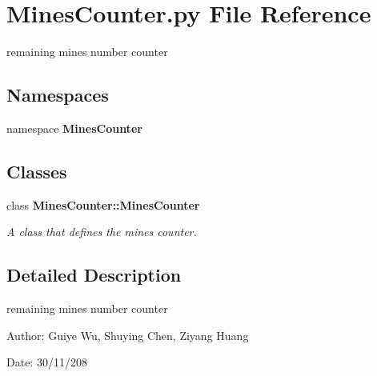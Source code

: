 \section{Mines\-Counter.py File Reference}
\label{MinesCounter_8py}
remaining mines number counter 

\subsection*{Namespaces}
\begin{CompactItemize}
\item 
namespace \textbf{Mines\-Counter}
\end{CompactItemize}
\subsection*{Classes}
\begin{CompactItemize}
\item 
class \bf{Mines\-Counter::Mines\-Counter}
\begin{CompactList}\small\item\em A class that defines the mines counter. \item\end{CompactList}\end{CompactItemize}


\subsection{Detailed Description}
remaining mines number counter 

\begin{Desc}
\item[Author:]Guiye Wu, Shuying Chen, Ziyang Huang \end{Desc}
\begin{Desc}
\item[Date:]30/11/208 \end{Desc}
